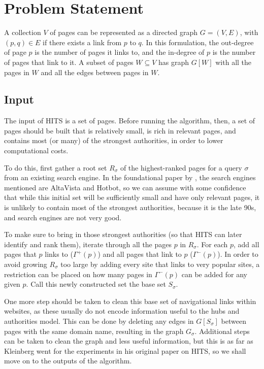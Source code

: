 \documentclass[11pt]{article}
\begin{document}
\section{Problem Statement}
A collection $V$ of pages can be represented as a directed graph \( G = (V, E) \), with $(p, q) \in E$ if there exists a link from $p$ to $q$. 
In this formulation, the out-degree of page $p$ is the number of pages it links to, and the in-degree of $p$ is the number of pages that link to it.
A subset of pages $W \subseteq V$ has graph $G[W]$ with all the pages in $W$ and all the edges between pages in $W$.

\subsection{Input}
The input of HITS is a set of pages.
Before running the algorithm, then, a set of pages should be built that is relatively small, is rich in relevant pages, and contains most (or many) of the strongest authorities, in order to lower computational costs.

To do this, first gather a root set $R_\sigma$ of the highest-ranked pages for a query $\sigma$ from an existing search engine.
In the foundational paper by \textcite{kleinberg_authoritative_1999}, the search engines mentioned are AltaVista and Hotbot, so we can assume with some confidence that while this initial set will be sufficiently small and have only relevant pages, it is unlikely to contain most of the strongest authorities, because it is the late 90s, and search engines are not very good.

To make sure to bring in those strongest authorities (so that HITS can later identify and rank them), iterate through all the pages $p$ in $R_\sigma$.
For each $p$, add all pages that $p$ links to ($\Gamma^+(p)$) and all pages that link to $p$ ($\Gamma^-(p)$).
In order to avoid growing $R_\sigma$ too large by adding every site that links to very popular sites, a restriction can be placed on how many pages in $\Gamma^-(p)$ can be added for any given $p$.
Call this newly constructed set the base set $S_\sigma$.

One more step should be taken to clean this base set of navigational links within websites, as these usually do not encode information useful to the hubs and authorities model.
This can be done by deleting any edges in $G[S_\sigma]$ between pages with the same domain name, resulting in the graph $G_\sigma$.
Additional steps can be taken to clean the graph and less useful information, but this is as far as Kleinberg went for the experiments in his original paper on HITS, so we shall move on to the outputs of the algorithm.
\end{document}
